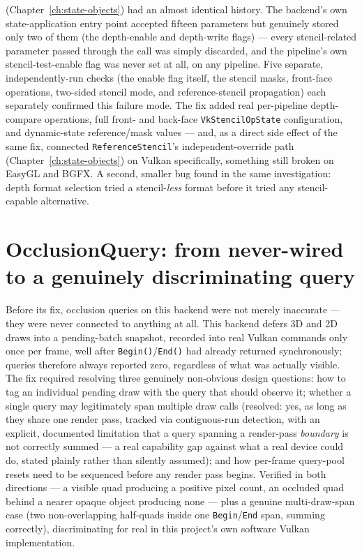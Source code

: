  (Chapter~\ref{ch:state-objects}) had an almost identical
history. The backend's own state-application entry point accepted fifteen parameters but
genuinely stored only two of them (the depth-enable and depth-write flags) --- every
stencil-related parameter passed through the call was simply discarded, and the pipeline's
own stencil-test-enable flag was never set at all, on any pipeline. Five separate,
independently-run checks (the enable flag itself, the stencil masks, front-face operations,
two-sided stencil mode, and reference-stencil propagation) each separately confirmed this
failure mode. The fix added real per-pipeline depth-compare operations, full front- and
back-face \texttt{VkStencilOpState} configuration, and dynamic-state reference/mask values ---
and, as a direct side effect of the same fix, connected \texttt{ReferenceStencil}'s
independent-override path (Chapter~\ref{ch:state-objects}) on Vulkan specifically, something
still broken on EasyGL and BGFX. A second, smaller bug found in the same investigation: depth
format selection tried a stencil-\emph{less} format before it tried any stencil-capable
alternative.

\section{OcclusionQuery: from never-wired to a genuinely discriminating query}

Before its fix, occlusion queries on this backend were not merely inaccurate --- they were
never connected to anything at all. This backend defers 3D and 2D draws into a pending-batch
snapshot, recorded into real Vulkan commands only once per frame, well after
\texttt{Begin()}/\texttt{End()} had already returned synchronously; queries therefore always
reported zero, regardless of what was actually visible. The fix required resolving three
genuinely non-obvious design questions: how to tag an individual pending draw with the query
that should observe it; whether a single query may legitimately span multiple draw calls
(resolved: yes, as long as they share one render pass, tracked via contiguous-run detection,
with an explicit, documented limitation that a query spanning a render-pass \emph{boundary}
is not correctly summed --- a real capability gap against what a real device could do, stated
plainly rather than silently assumed); and how per-frame query-pool resets need to be
sequenced before any render pass begins. Verified in both directions --- a visible quad
producing a positive pixel count, an occluded quad behind a nearer opaque object producing
none --- plus a genuine multi-draw-span case (two non-overlapping half-quads inside one
\texttt{Begin}/\texttt{End} span, summing correctly), discriminating for real in this
project's own software Vulkan implementation.

